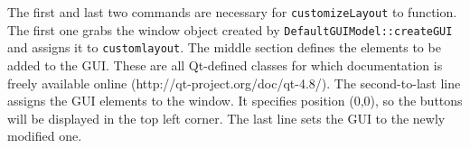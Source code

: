 The first and last two commands are necessary for \texttt{customizeLayout} to function. The first one grabs the window object created by \texttt{DefaultGUIModel::createGUI} and assigns it to \texttt{customlayout}. The middle section defines the elements to be added to the GUI. These are all Qt-defined classes for which documentation is freely available online (http://qt-project.org/doc/qt-4.8/). The second-to-last line assigns the GUI elements to the window. It specifies position (0,0), so the buttons will be displayed in the top left corner. The last line sets the GUI to the newly modified one. 